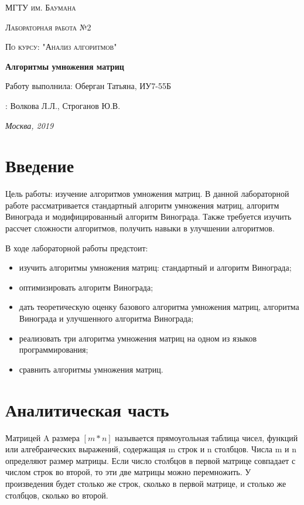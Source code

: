 \documentclass[12pt]{report}
\begin{document}
\begin{titlepage}
	\centering
	{\scshape\LARGE МГТУ им. Баумана \par}
	\vspace{3cm}
	{\scshape\Large Лабораторная работа №2\par}
	\vspace{0.5cm}	
	{\scshape\Large По курсу: "Анализ алгоритмов"\par}
	\vspace{1.5cm}
	{\huge\bfseries Алгоритмы умножения матриц\par}
	\vspace{2cm}
	\Large Работу выполнила: Оберган Татьяна, ИУ7-55Б\par
	\vspace{0.5cm}
	:  Волкова Л.Л., Строганов Ю.В.\par

	\vfill
	\large \textit {Москва, 2019} \par
\end{titlepage}

\tableofcontents

\newpage
\chapter*{Введение}
Цель работы: изучение алгоритмов умножения матриц. В данной лабораторной работе рассматривается стандартный алгоритм умножения матриц, алгоритм Винограда и модифицированный алгоритм Винограда.  Также требуется изучить рассчет сложности алгоритмов, получить навыки в улучшении алгоритмов.


В ходе лабораторной работы предстоит:
\begin{itemize}
	\item изучить алгоритмы умножения матриц: стандартный и алгоритм Винограда; 
	\item оптимизировать алгоритм Винограда; 
	\item дать теоретическую оценку базового алгоритма умножения матриц, алгоритма Винограда и улучшенного алгоритма Винограда;
	\item реализовать три алгоритма умножения матриц на одном из языков программирования;  
	\item сравнить алгоритмы умножения матриц.
\end{itemize}



\chapter{Аналитическая часть}
Матрицей A размера $[m*n]$ называется прямоугольная таблица
чисел, функций или алгебраических выражений, содержащая m строк и n столбцов. Числа m и n определяют размер матрицы.\cite{Beloysov} Если число столбцов в первой матрице совпадает с числом строк во второй, то эти две матрицы можно перемножить. У произведения будет столько же строк, сколько в первой матрице, и столько же столбцов, сколько во второй.
	    
\end{document}
